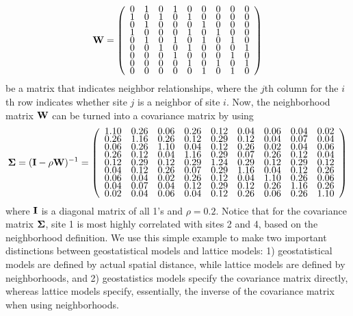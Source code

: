 \documentclass[11pt, titlepage]{article}\usepackage[]{graphicx}\usepackage[]{color}
\begin{document}
\begin{spacing}{1.9}
\begin{flushleft}
\[
\renewcommand\arraystretch{.5}
\bW = \left(
\begin{array}{ccccccccc}
 0 & 1 & 0 & 1 & 0 & 0 & 0 & 0 & 0 \\ 
  1 & 0 & 1 & 0 & 1 & 0 & 0 & 0 & 0 \\ 
  0 & 1 & 0 & 0 & 0 & 1 & 0 & 0 & 0 \\ 
  1 & 0 & 0 & 0 & 1 & 0 & 1 & 0 & 0 \\ 
  0 & 1 & 0 & 1 & 0 & 1 & 0 & 1 & 0 \\ 
  0 & 0 & 1 & 0 & 1 & 0 & 0 & 0 & 1 \\ 
  0 & 0 & 0 & 1 & 0 & 0 & 0 & 1 & 0 \\ 
  0 & 0 & 0 & 0 & 1 & 0 & 1 & 0 & 1 \\ 
  0 & 0 & 0 & 0 & 0 & 1 & 0 & 1 & 0 \\ 
  
\end{array}
\right)
\]
be a matrix that indicates neighbor relationships, where the $j$th column for the $i$th row indicates whether site $j$ is a neighbor of site $i$.  Now, the neighborhood matrix $\mathbf{W}$ can be turned into a covariance matrix by using 
{
\[
\renewcommand\arraystretch{.5}
\bSigma = (\bI - \rho\bW)\upi  = \left(
\begin{array}{ccccccccc}
 1.10 & 0.26 & 0.06 & 0.26 & 0.12 & 0.04 & 0.06 & 0.04 & 0.02 \\ 
  0.26 & 1.16 & 0.26 & 0.12 & 0.29 & 0.12 & 0.04 & 0.07 & 0.04 \\ 
  0.06 & 0.26 & 1.10 & 0.04 & 0.12 & 0.26 & 0.02 & 0.04 & 0.06 \\ 
  0.26 & 0.12 & 0.04 & 1.16 & 0.29 & 0.07 & 0.26 & 0.12 & 0.04 \\ 
  0.12 & 0.29 & 0.12 & 0.29 & 1.24 & 0.29 & 0.12 & 0.29 & 0.12 \\ 
  0.04 & 0.12 & 0.26 & 0.07 & 0.29 & 1.16 & 0.04 & 0.12 & 0.26 \\ 
  0.06 & 0.04 & 0.02 & 0.26 & 0.12 & 0.04 & 1.10 & 0.26 & 0.06 \\ 
  0.04 & 0.07 & 0.04 & 0.12 & 0.29 & 0.12 & 0.26 & 1.16 & 0.26 \\ 
  0.02 & 0.04 & 0.06 & 0.04 & 0.12 & 0.26 & 0.06 & 0.26 & 1.10 \\ 
  
\end{array}
\right)
\]
}
where $\mathbf{I}$ is a diagonal matrix of all 1's and $\rho=0.2$.  Notice that for the covariance matrix $\mbox{\boldmath $\Sigma$}$, site 1 is most highly correlated with sites 2 and 4, based on the neighborhood definition.  We use this simple example to make two important distinctions between geostatistical models and lattice models: 1) geostatistical models are defined by actual spatial distance, while lattice models are defined by neighborhoods, and 2) geostatistics models specify the covariance matrix directly, whereas lattice models specify, essentially, the inverse of the covariance matrix when using neighborhoods.


\end{flushleft}
\end{spacing}
\end{document}
